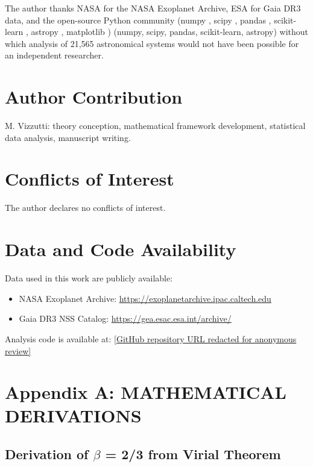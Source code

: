 \documentclass[10pt,a4paper]{article}
\begin{document}
The author thanks NASA for the NASA Exoplanet Archive, ESA for Gaia DR3
data, and the open-source Python community (numpy \cite{ScipyDevelopers2020}, scipy \cite{ScipyDevelopers2020}, pandas \cite{ref72}, scikit-learn \cite{Pedregosa2011}, astropy \cite{AstropyCollaboration2013,AstropyCollaboration2018}, matplotlib \cite{Hunter2007}) (numpy, scipy, pandas,
scikit-learn, astropy) without which analysis of 21,565 astronomical
systems would not have been possible for an independent researcher.

\section*{Author Contribution}\label{author-contribution}

M. Vizzutti: theory conception, mathematical framework development, statistical data analysis, manuscript writing.

\section*{Conflicts of Interest}\label{conflicts-of-interest}

The author declares no conflicts of interest.

\section*{Data and Code Availability}\label{data-and-code-availability}

Data used in this work are publicly available:
\begin{itemize}
  \item NASA Exoplanet Archive: \url{https://exoplanetarchive.ipac.caltech.edu}
  \item Gaia DR3 NSS Catalog: \url{https://gea.esac.esa.int/archive/}
\end{itemize}

Analysis code is available at: \url{[GitHub repository URL redacted for anonymous review]}

\section*{Appendix A: MATHEMATICAL
DERIVATIONS}\label{appendix-a-mathematical-derivations}

\subsection*{Derivation of $\beta$ = 2/3 from Virial
Theorem}\label{a.1-derivation-of-ux3b2-23-from-virial-theorem}
\end{document}
